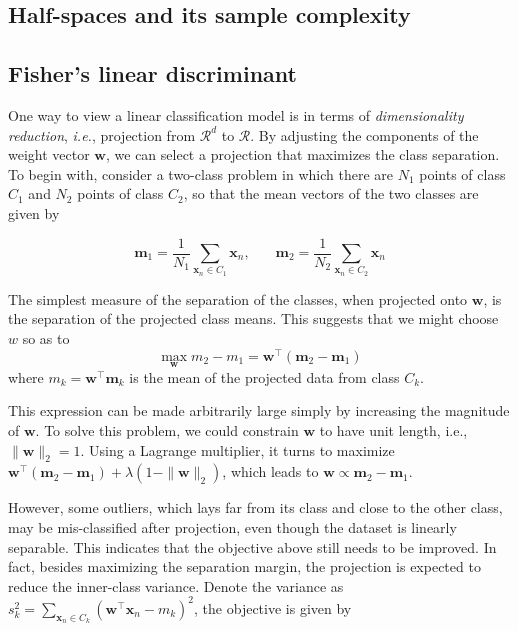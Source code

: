 \documentclass{article}
\begin{document}
	\subsection{Half-spaces and its sample complexity}
	
	
	
	\subsection{Fisher's linear discriminant}
	
	One way to view a linear classification model is in terms of \textit{dimensionality reduction}, \textit{i.e.}, projection from $\mathcal{R}^d$ to $\mathcal{R}$. By adjusting the components of the weight vector $\mathbf{w}$, we can select a projection that maximizes the class separation. To begin with, consider a two-class problem in which there are $N_1$ points of class $C_1$ and $N_2$ points of class $C_2$, so that the mean vectors of the two classes are given by

	\begin{equation*}
	\mathbf{m}_1 = \frac{1}{N_1} \sum_{\mathbf{x}_n \in C_1} \mathbf{x}_n,\ \ \ \ \ \ \ \ 
	\mathbf{m}_2 = \frac{1}{N_2} \sum_{\mathbf{x}_n \in C_2} \mathbf{x}_n
	\end{equation*}
	
	The simplest measure of the separation of the classes, when projected onto $\mathbf{w}$, is the separation of the projected class means. This suggests that we might choose $w$ so as to
	\begin{equation*}
	\max_\mathbf{w} m_2- m_1=\mathbf{w}^\top (\mathbf{m}_2-\mathbf{m}_1)
	\end{equation*}
where $m_k=\mathbf{w}^\top \mathbf{m}_k$ is the mean of the projected data from class $C_k$. 

	This expression can be made arbitrarily large simply by increasing the magnitude of $\mathbf{w}$. To solve this problem, we could constrain $\mathbf{w}$ to have unit length, i.e., $\|\mathbf{w}\|_2=1$. Using a Lagrange multiplier, it turns to maximize $\mathbf{w}^\top (\mathbf{m}_2-\mathbf{m}_1) + \lambda (1-\|\mathbf{w}\|_2)$, which leads to $\mathbf{w}\propto \mathbf{m}_2-\mathbf{m}_1$.
	
	However, some outliers, which lays far from its class and close to the other class, may be mis-classified after projection, even though the dataset is linearly separable. This indicates that the objective above still needs to be improved. In fact, besides maximizing the separation margin, the projection is expected to reduce the inner-class variance. Denote the variance as $s_k^2=\sum_{\mathbf{x}_n\in C_k} (\mathbf{w}^\top\mathbf{x}_n-m_k)^2$, the objective is given by
	
\end{document}
